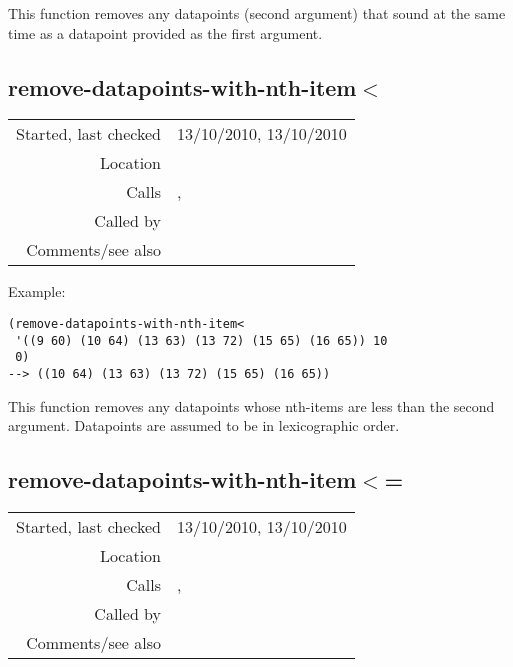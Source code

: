 This function removes any datapoints (second argument)
that sound at the same time as a datapoint provided as
the first argument.


\subsection*{remove-datapoints-with-nth-item$<$}\label{fun:remove-datapoints-with-nth-item<}

\vspace{0.3cm}
\begin{tabular}{r|p{8cm}}
Started, last checked & 13/10/2010, 13/10/2010 \\
Location & \nameref{sec:generating-beat-MNN-spacing-for-and-back} \\
Calls & \nameref{fun:index-1st-sublist-item>=}, \nameref{fun:nth-list-of-lists} \\
Called by & \nameref{fun:unite-datapoints} \\
Comments/see also &
\end{tabular}

\vspace{0.5cm}
\noindent Example:
\begin{verbatim}
(remove-datapoints-with-nth-item<
 '((9 60) (10 64) (13 63) (13 72) (15 65) (16 65)) 10
 0)
--> ((10 64) (13 63) (13 72) (15 65) (16 65))
\end{verbatim}

This function removes any datapoints whose nth-items
are less than the second argument. Datapoints are
assumed to be in lexicographic order.


\subsection*{remove-datapoints-with-nth-item$<$=}\label{fun:remove-datapoints-with-nth-item<=}

\vspace{0.3cm}
\begin{tabular}{r|p{8cm}}
Started, last checked & 13/10/2010, 13/10/2010 \\
Location & \nameref{sec:generating-beat-MNN-spacing-for-and-back} \\
Calls & \nameref{fun:index-1st-sublist-item>}, \nameref{fun:nth-list-of-lists} \\
Called by & \nameref{fun:unite-datapoints} \\
Comments/see also &
\end{tabular}

